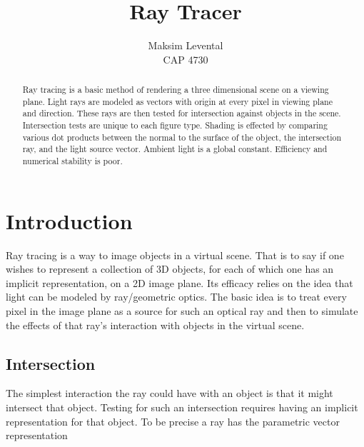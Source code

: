 \documentclass[12pt]{article}
\begin{document}
 
 
\title{Ray Tracer}%
\author{Maksim Levental\\ %
CAP 4730} %
 
\maketitle
\newpage
\tableofcontents
\newpage
\begin{abstract}

Ray tracing is a basic method of rendering a three dimensional scene on a viewing plane. Light rays are modeled as vectors with origin at every pixel in viewing plane and direction. These rays are then tested for intersection against objects in the scene. Intersection tests are unique to each figure type. Shading is effected by comparing various dot products between the normal to the surface of the object, the intersection ray, and the light source vector. Ambient light is a global constant. Efficiency and numerical stability is poor.

\end{abstract}

\section{Introduction}

Ray tracing is a way to image objects in a virtual scene. That is to say if one wishes to represent a collection of 3D objects, for each of which one has an implicit representation, on a 2D image plane. Its efficacy relies on the idea that light can be modeled by ray/geometric optics. The basic idea is to treat every pixel in the image plane as a source for such an optical ray and then to simulate the effects of that ray's interaction with objects in the virtual scene.

\subsection{Intersection}

The simplest interaction the ray could have with an object is that it might intersect that object. Testing for such an intersection requires having an implicit representation for that object. To be precise a ray has the parametric vector representation 
\end{document}
